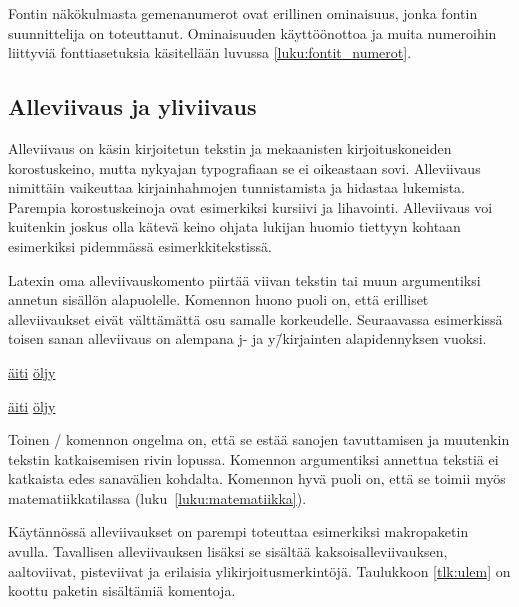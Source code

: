 Fontin näkökulmasta gemenanumerot ovat erillinen ominaisuus, jonka
fontin suunnittelija on toteuttanut. Ominaisuuden käyttöönottoa ja muita
numeroihin liittyviä fonttiasetuksia käsitellään luvussa
\ref{luku:fontit_numerot}.

\subsection{Alleviivaus ja yliviivaus}

Alleviivaus on käsin kirjoitetun tekstin ja mekaanisten
kirjoituskoneiden korostuskeino, mutta nykyajan typografiaan se ei
oikeastaan sovi. Alleviivaus nimittäin vaikeuttaa kirjainhahmojen
tunnistamista ja hidastaa lukemista. Parempia korostuskeinoja ovat
esimerkiksi kursiivi ja lihavointi. Alleviivaus voi kuitenkin joskus
olla kätevä keino ohjata lukijan huomio tiettyyn kohtaan esimerkiksi
pidemmässä esimerkkitekstissä.

Latexin oma alleviivauskomento  piirtää viivan
tekstin tai muun argumentiksi annetun sisällön alapuolelle. Komennon
huono puoli on, että erilliset alleviivaukset eivät välttämättä osu
samalle korkeudelle. Seuraavassa esimerkissä toisen sanan alleviivaus on
alempana j- ja y\=/kirjainten alapidennyksen vuoksi.

\begin{koodilohkosis}
  \underline{äiti} \underline{öljy}
\end{koodilohkosis}

\begin{tulossis}
  \underline{äiti} \underline{öljy}
\end{tulossis}

Toinen \-/ komennon ongelma on, että se estää sanojen
tavuttamisen ja muutenkin tekstin katkaisemisen rivin lopussa. Komennon
argumentiksi annettua tekstiä ei katkaista edes sanavälien kohdalta.
Komennon hyvä puoli on, että se toimii myös matematiikkatilassa
(luku~\ref{luku:matematiikka}).

Käytännössä alleviivaukset on parempi toteuttaa esimerkiksi makropaketin
 avulla. Tavallisen alleviivauksen lisäksi se
sisältää kaksoisalleviivauksen, aaltoviivat, pisteviivat ja erilaisia
ylikirjoitusmerkintöjä. Taulukkoon \ref{tlk:ulem} on koottu paketin
sisältämiä komentoja.

\providecommand{\rivi}{}
\renewcommand{\rivi}[2]{\komento{#1} & #2}

